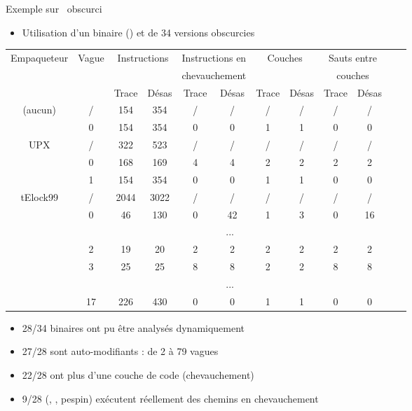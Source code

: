 \documentclass{beamer}
\begin{document}
\begin{frame}{Exemple sur \hostname\ obscurci}
\begin{itemize}
 \item Utilisation d'un binaire (\hostname) et de 34 versions obscurcies
\end{itemize}

\pause
\begin{tiny}
\begin{longtable}{|c|c|c|c|c|c|c|c|c|c|c|c|}
\hline
Empaqueteur & Vague & \multicolumn{2}{c|}{Instructions} & \multicolumn{2}{c|}{Instructions en} & \multicolumn{2}{c|}{Couches} & \multicolumn{2}{c|}{Sauts entre}\\
 &  & \multicolumn{2}{c|}{} & \multicolumn{2}{c|}{chevauchement} & \multicolumn{2}{c|}{} & \multicolumn{2}{c|}{couches}\\
  &   & Trace & Désas & Trace & Désas & Trace & Désas & Trace & Désas\\
\hline
\endhead
\rowcolor{lightgray}(aucun) & / & 154 & 354 & / & / & / & / & / & /\\
  & 0 & 154 & 354 & 0 & 0 & 1 & 1 & 0 & 0\\
\hline
\hline
\rowcolor{lightgray}UPX & / & 322 & 523 & / & / & / & / & / & /\\
  & 0 & 168 & 169 & 4 & 4 & 2 & 2 & 2 & 2\\
  & 1 & 154 & 354 & 0 & 0 & 1 & 1 & 0 & 0\\
\hline
\rowcolor{lightgray}tElock99 & / & 2044 & 3022 & / & / & / & / & / & /\\
  & 0 & 46 & 130 & 0 & 42 & 1 & 3 & 0 & 16\\
  & \multicolumn{9}{c|}{...}\\
  & 2 & 19 & 20 & 2 & 2 & 2 & 2 & 2 & 2\\
  & 3 & 25 & 25 & 8 & 8 & 2 & 2 & 8 & 8\\
  & \multicolumn{9}{c|}{...}\\
  & 17 & 226 & 430 & 0 & 0 & 1 & 1 & 0 & 0\\
\hline
\end{longtable}
\end{tiny}

\pause
\begin{itemize}
 \item 28/34 binaires ont pu être analysés dynamiquement
 \item 27/28 sont auto-modifiants : de 2 à 79 vagues
 \item 22/28 ont plus d'une couche de code (chevauchement)
 \item 9/28 (\telock, \upx, pespin) exécutent réellement des chemins en chevauchement
\end{itemize}
\end{frame}
\end{document}
